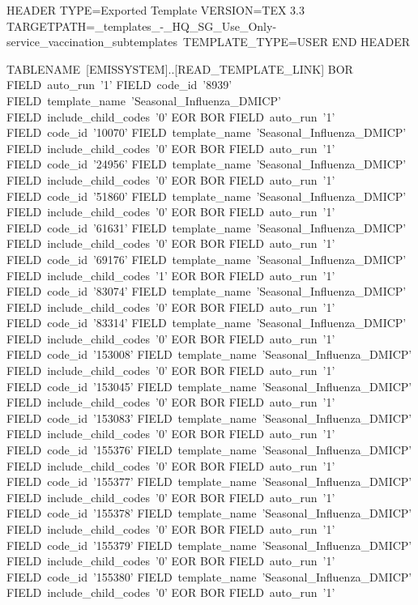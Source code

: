 HEADER
TYPE=Exported Template
VERSION=TEX 3.3
TARGETPATH=\Live_templates_-_HQ_SG_Use_Only\Tri-service_vaccination_subtemplates\
TEMPLATE_TYPE=USER
END HEADER

TABLENAME~[EMISSYSTEM]..[READ_TEMPLATE_LINK]
  BOR
    FIELD~auto_run~'1'
    FIELD~code_id~'8939'
    FIELD~template_name~'Seasonal_Influenza_DMICP'
    FIELD~include_child_codes~'0'
  EOR
  BOR
    FIELD~auto_run~'1'
    FIELD~code_id~'10070'
    FIELD~template_name~'Seasonal_Influenza_DMICP'
    FIELD~include_child_codes~'0'
  EOR
  BOR
    FIELD~auto_run~'1'
    FIELD~code_id~'24956'
    FIELD~template_name~'Seasonal_Influenza_DMICP'
    FIELD~include_child_codes~'0'
  EOR
  BOR
    FIELD~auto_run~'1'
    FIELD~code_id~'51860'
    FIELD~template_name~'Seasonal_Influenza_DMICP'
    FIELD~include_child_codes~'0'
  EOR
  BOR
    FIELD~auto_run~'1'
    FIELD~code_id~'61631'
    FIELD~template_name~'Seasonal_Influenza_DMICP'
    FIELD~include_child_codes~'0'
  EOR
  BOR
    FIELD~auto_run~'1'
    FIELD~code_id~'69176'
    FIELD~template_name~'Seasonal_Influenza_DMICP'
    FIELD~include_child_codes~'1'
  EOR
  BOR
    FIELD~auto_run~'1'
    FIELD~code_id~'83074'
    FIELD~template_name~'Seasonal_Influenza_DMICP'
    FIELD~include_child_codes~'0'
  EOR
  BOR
    FIELD~auto_run~'1'
    FIELD~code_id~'83314'
    FIELD~template_name~'Seasonal_Influenza_DMICP'
    FIELD~include_child_codes~'0'
  EOR
  BOR
    FIELD~auto_run~'1'
    FIELD~code_id~'153008'
    FIELD~template_name~'Seasonal_Influenza_DMICP'
    FIELD~include_child_codes~'0'
  EOR
  BOR
    FIELD~auto_run~'1'
    FIELD~code_id~'153045'
    FIELD~template_name~'Seasonal_Influenza_DMICP'
    FIELD~include_child_codes~'0'
  EOR
  BOR
    FIELD~auto_run~'1'
    FIELD~code_id~'153083'
    FIELD~template_name~'Seasonal_Influenza_DMICP'
    FIELD~include_child_codes~'0'
  EOR
  BOR
    FIELD~auto_run~'1'
    FIELD~code_id~'155376'
    FIELD~template_name~'Seasonal_Influenza_DMICP'
    FIELD~include_child_codes~'0'
  EOR
  BOR
    FIELD~auto_run~'1'
    FIELD~code_id~'155377'
    FIELD~template_name~'Seasonal_Influenza_DMICP'
    FIELD~include_child_codes~'0'
  EOR
  BOR
    FIELD~auto_run~'1'
    FIELD~code_id~'155378'
    FIELD~template_name~'Seasonal_Influenza_DMICP'
    FIELD~include_child_codes~'0'
  EOR
  BOR
    FIELD~auto_run~'1'
    FIELD~code_id~'155379'
    FIELD~template_name~'Seasonal_Influenza_DMICP'
    FIELD~include_child_codes~'0'
  EOR
  BOR
    FIELD~auto_run~'1'
    FIELD~code_id~'155380'
    FIELD~template_name~'Seasonal_Influenza_DMICP'
    FIELD~include_child_codes~'0'
  EOR
  BOR
    FIELD~auto_run~'1'
